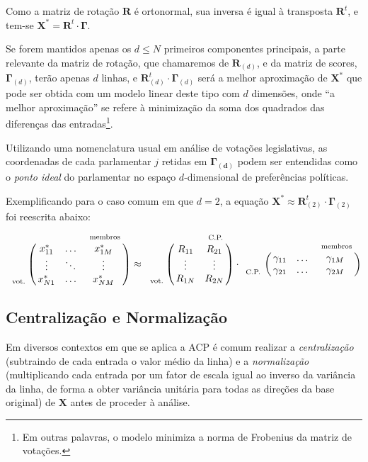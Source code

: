 \documentclass[a4paper, 12pt]{article}
\let\bbordermatrix\bordermatrix
\begin{document}
Como a matriz de rotação $\mathbf{R}$ é ortonormal, sua inversa é igual à transposta $\mathbf{R}^{t}$, e tem-se $\mathbf{X^{*}} = \mathbf{R}^t \cdot \mathbf{\Gamma}$.

Se forem mantidos apenas os $d \leq N$ primeiros componentes principais, a parte relevante da matriz de rotação, que chamaremos de $\mathbf{R}_{(d)}$, e da matriz de scores, $\mathbf{\Gamma}_{(d)}$, terão apenas $d$ linhas, e $\mathbf{R}_{(d)}^{t}\cdot \mathbf{\Gamma}_{(d)}$ será a melhor aproximação de $\mathbf{X^{*}}$ que pode ser obtida com um modelo linear deste tipo com $d$ dimensões, onde ``a melhor aproximação'' se refere à minimização da soma dos quadrados das diferenças das entradas\footnote{Em outras palavras, o modelo minimiza a norma de Frobenius da matriz de votações.}.

Utilizando uma nomenclatura usual em análise de votações legislativas, as coordenadas de cada parlamentar $j$ retidas em $\mathbf{\Gamma_{(d)}}$ podem ser entendidas como o \emph{ponto ideal} do parlamentar no espaço $d$-dimensional de preferências políticas.

Exemplificando para o caso comum em que $d=2$, a equação $\mathbf{X^{*}} \approx \mathbf{R}_{(2)}^{t} \cdot \mathbf{\Gamma}_{(2)}$ foi reescrita abaixo:
\[
  \bbordermatrix{~  & ~ & ~ & ~_\text{membros} \cr
                ~ & x^{*}_{11} & \ldots & x^{*}_{1M}   \cr
                ~ & \vdots & \ddots & \vdots  \cr
                ~_\text{vot.} & x^{*}_{N1} & \ldots & x^{*}_{NM}   \cr
                } \approx
  \bbordermatrix{~  & ~ & ~_\text{C.P.} \cr
                ~ & R_{11} & R_{21}   \cr
                ~ & \vdots & \vdots  \cr
                ~_\text{vot.} & R_{1N} & R_{2N} \cr
                } \cdot
  \bbordermatrix{~  & ~ & ~ & ~_\text{membros} \cr
                ~ & \gamma_{11} & \ldots & \gamma_{1M}   \cr
                ~_\text{C.P.} & \gamma_{21} & \ldots & \gamma_{2M}   \cr
                }
\]


\subsection*{Centralização e Normalização}

Em diversos contextos em que se aplica a ACP é comum realizar a \emph{centralização} (subtraindo de cada entrada o valor médio da linha) e a \emph{normalização} (multiplicando cada entrada por um fator de escala igual ao inverso da variância da linha, de forma a obter variância unitária para todas as direções da base original) de $\mathbf{X}$ antes de proceder à análise.
\end{document}
